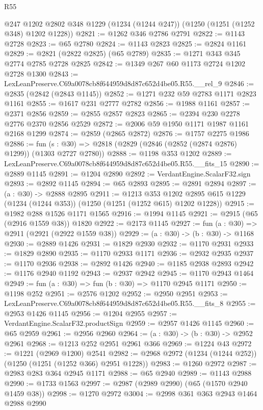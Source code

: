 \begin{lexlean}{R55}
\begin{coremodule}
    @247
    @1202
    @2802
    @348
    @1229
    (@1234 (@1244 @247))
    (@1250 (@1251 (@1252 @348) @1202 @1228))
@2821 := @1262 @346 @2786 @2791
@2822 := @1143 @2728
@2823 := @65 @2780
@2824 := @1143 @2823
@2825 := @2824 @1161
@2829 := @2821 (@2822 @2825) (@65 @2789)
@2835 := @1271 @343 @345 @2774 @2785 @2728 @2825
@2842 := @1349 @267 @60 @1173 @2724 @1202 @2728 @1300
@2843 := LexLeanPreserve.C69a0078cb8f644959d8d87c652d4be05.R55.__rel_9
@2846 := @2835 (@2842 (@2843 @1145))
@2852 := @1271 @232 @59 @2783 @1171 @2823 @1161
@2855 := @1617 @231 @2777 @2782
@2856 := @1988 @1161
@2857 := @2371 @2856
@2859 := @2855 @2857 @2823
@2865 := @2394 @230 @2278 @2776 @2370 @2856 @2529
@2872 := @2006 @59 @1950 @1171 @1987 @1161 @2168 @1299
@2874 := @2859 (@2865 @2872)
@2876 := @1757 @2275 @1986
@2886 := fun (s : @30) => @2818 (@2829 (@2846 (@2852 (@2874 @2876) @1299)) (@1303 @2727 @2780))
@2888 := @1198 @353 @1202
@2889 := LexLeanPreserve.C69a0078cb8f644959d8d87c652d4be05.R55.__fits_15
@2890 := @2889 @1145
@2891 := @1204 @2890
@2892 := VerdantEngine.ScalarF32.sign
@2893 := @2892 @1145
@2894 := @65 @2893
@2895 := @2891 @2894
@2897 := (a : @30) -> @2888 @2895
@2911 := @1213
    @353
    @1202
    @2895
    @615
    @1229
    (@1234 (@1244 @353))
    (@1250 (@1251 (@1252 @615) @1202 @1228))
@2915 := @1982 @288 @1526 @1171 @1565
@2916 := @1994 @1145
@2921 := @2915 (@65 (@2916 @1559 @38)) @1820
@2922 := @2173 @1145
@2927 := fun (a : @30) => @2911 (@2921 (@2922 @1559 @38))
@2929 := (a : @30) -> (b : @30) -> @1168
@2930 := @2889 @1426
@2931 := @1829 @2930
@2932 := @1170 @2931
@2933 := @1829 @2890
@2935 := @1170 @2933 @1171
@2936 := @2932 @2935
@2937 := @1170 @2936
@2938 := @2892 @1426
@2940 := @1185 @2938 @2893
@2942 := @1176 @2940 @1192
@2943 := @2937 @2942
@2945 := @1170 @2943 @1464
@2949 := fun (a : @30) => fun (b : @30) => @1170 @2945 @1171
@2950 := @1198 @252
@2951 := @2576 @1202
@2952 := @2950 @2951
@2953 := LexLeanPreserve.C69a0078cb8f644959d8d87c652d4be05.R55.__fits_8
@2955 := @2953 @1426 @1145
@2956 := @1204 @2955
@2957 := VerdantEngine.ScalarF32.productSign
@2959 := @2957 @1426 @1145
@2960 := @65 @2959
@2961 := @2956 @2960
@2964 := (a : @30) -> (b : @30) -> @2952 @2961
@2968 := @1213 @252 @2951 @2961 @366
@2969 := @1224 @43
@2972 := @1221 (@2969 @1200) @2541
@2982 := @2968 @2972 (@1234 (@1244 @252)) (@1250 (@1251 (@1252 @366) @2951 @1228))
@2983 := @1260 @2972
@2987 := @2983 @283 @364 @2945 @1171
@2988 := @65 @2940
@2989 := @1143 @2988
@2990 := @1733 @1563
@2997 := @2987 (@2989 @2990) (@65 (@1570 @2940 @1459 @38))
@2998 := @1270 @2972
@3004 := @2998 @361 @363 @2943 @1464 @2988 @2990

\end{coremodule}
\end{lexlean}
